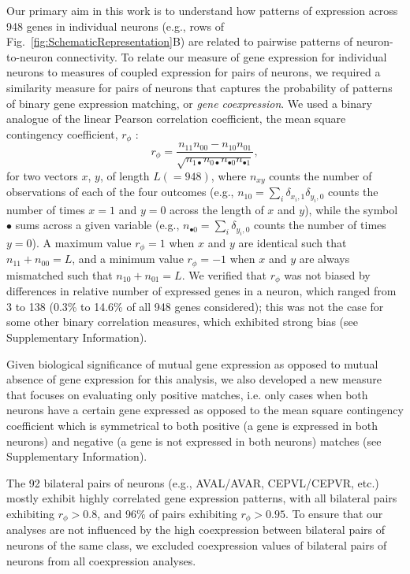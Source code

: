 \documentclass[10pt,letterpaper]{article}
\begin{document}
Our primary aim in this work is to understand how patterns of expression across 948 genes in individual neurons (e.g., rows of Fig.~\ref{fig:SchematicRepresentation}B) are related to pairwise patterns of neuron-to-neuron connectivity.
To relate our measure of gene expression for individual neurons to measures of coupled expression for pairs of neurons, we required a similarity measure for pairs of neurons that captures the probability of patterns of binary gene expression matching, or \emph{gene coexpression}.
We used a binary analogue of the linear Pearson correlation coefficient, the mean square contingency coefficient, $r_\phi$ \cite{Warrens2008}:
\begin{equation} \label{eq:rphi}
    r_\phi = \frac{n_{11}n_{00} - n_{10}n_{01}}{\sqrt{n_{1\bullet}n_{0\bullet}n_{\bullet 0}n_{\bullet 1}}},
\end{equation}
for two vectors $x$, $y$, of length $L (=948)$, where $n_{xy}$ counts the number of observations of each of the four outcomes (e.g., $n_{10} = \sum_i \delta_{x_i,1}\delta_{y_i,0}$ counts the number of times $x=1$ and $y=0$ across the length of $x$ and $y$), while the symbol $\bullet$ sums across a given variable (e.g., $n_{\bullet 0} = \sum_i \delta_{y_i,0}$ counts the number of times $y = 0$).
A maximum value $r_\phi = 1$ when $x$ and $y$ are identical such that $n_{11} + n_{00} = L$, and a minimum value $r_\phi = -1$ when $x$ and $y$ are always mismatched such that $n_{10} + n_{01} = L$.
We verified that $r_\phi$ was not biased by differences in relative number of expressed genes in a neuron, which ranged from 3 to 138 (0.3\% to 14.6\% of all 948 genes considered); this was not the case for some other binary correlation measures, which exhibited strong bias (see Supplementary Information).

Given biological significance of mutual gene expression as opposed to mutual absence of gene expression for this analysis, we also developed a new measure that focuses on evaluating only positive matches, i.e. only cases when both neurons have a certain gene expressed as opposed to the mean square contingency coefficient which is symmetrical to both positive (a gene is expressed in both neurons) and negative (a gene is not expressed in both neurons) matches (see Supplementary Information). 

The 92 bilateral pairs of neurons (e.g., AVAL/AVAR, CEPVL/CEPVR, etc.) mostly exhibit highly correlated gene expression patterns, with all bilateral pairs exhibiting $r_\phi > 0.8$, and 96\% of pairs exhibiting $r_\phi > 0.95$.
To ensure that our analyses are not influenced by the high coexpression between bilateral pairs of neurons of the same class, we excluded coexpression values of bilateral pairs of neurons from all coexpression analyses.
\end{document}
